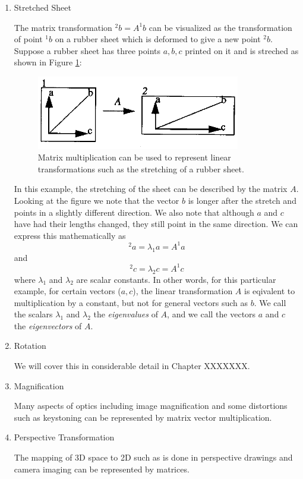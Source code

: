 \begin{enumerate}
  \item  Stretched Sheet

The matrix transformation $^2b = A ^1b$ can be visualized as the transformation of point $^1b$ on a rubber sheet which is
deformed to give a new point $^2b$.  Suppose a rubber sheet has three points $a, b, c$ printed on it and is streched as shown in Figure \ref{StretchedSheet}:

\begin{figure}
\includegraphics[width=3.5in]{figs11/00321.eps}
\caption{Matrix multiplication can be used to represent linear transformations such as the stretching of a rubber sheet.}\label{StretchedSheet}
\end{figure}

In this example, the stretching of the sheet can be described by the matrix $A$.   Looking at the figure we note that the vector $b$ is longer
after the stretch and points in a slightly different direction.   We also note that although $a$ and $c$ have had their lengths changed, they still point
in the same direction.   We can express this mathematically as
\[
^2a = \lambda_1a = A^1a
\]
and
\[
^2c = \lambda_2c = A^1c
\]
where $\lambda_1 $ and $\lambda_2 $ are scalar constants.   In other words, for this particular example, for certain vectors ($a,c$), the linear transformation
$A$ is eqivalent to multiplication by a constant, but not for general vectors such as $b$.
We call the scalars $\lambda_1$ and $\lambda_2$ the {\it eigenvalues} of $A$, and we call the vectors $a$ and $c$ the {\it eigenvectors} of $A$.

\item Rotation

We will cover this in considerable detail in Chapter XXXXXXX.

\item Magnification

Many aspects of optics including image magnification and some distortions such as keystoning can be represented by matrix vector multiplication.


\item Perspective Transformation

The mapping of 3D space to 2D such as is done in perspective drawings and camera imaging can be represented by matrices.


\end{enumerate}



